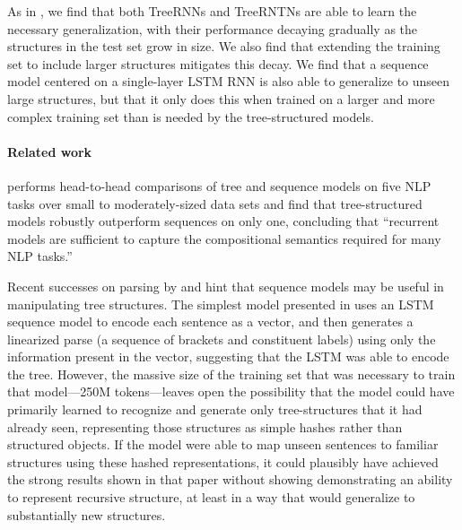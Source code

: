 As in , we find that both TreeRNNs and TreeRNTNs are able to learn the necessary generalization, with their performance decaying gradually as the structures in the test set grow in size. We also find that extending the training set to include larger structures mitigates this decay. We find that a sequence model centered on a single-layer LSTM RNN is also able to generalize to unseen large structures, but that it only does this when trained on a larger and more complex training set than is needed by the tree-structured models. 

\paragraph{Related work}
 performs head-to-head comparisons of tree and sequence models on five NLP tasks over small to moderately-sized data sets and find that tree-structured models robustly outperform sequences on only one, concluding that ``recurrent models are sufficient to capture the compositional semantics required for many NLP tasks.''

Recent successes on parsing by  and  hint that sequence models may be useful in manipulating tree structures. The simplest model presented in  uses an LSTM sequence model to encode each sentence as a vector, and then generates a linearized parse (a sequence of brackets and constituent labels) using only the information present in the vector, suggesting that the LSTM was able to encode the tree. However, the massive size of the training set that was necessary to train that model---250M tokens---leaves open the possibility that the model could have primarily learned to recognize and generate only tree-structures that it had already seen, representing those structures as simple hashes rather than structured objects. If the model were able to map unseen sentences to familiar structures using these hashed representations, it could plausibly have achieved the strong results shown in that paper without showing demonstrating an ability to represent recursive structure, at least in a way that would generalize to substantially new structures.
